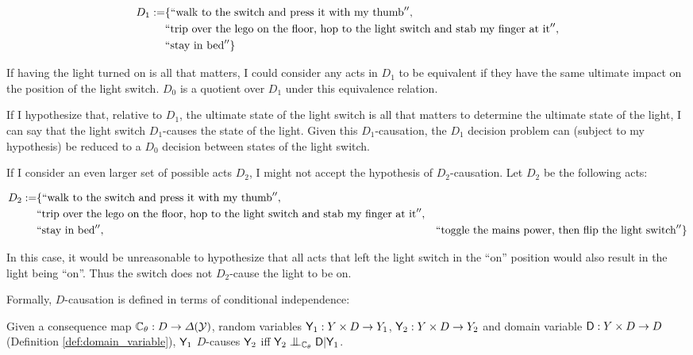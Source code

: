 \begin{align*}
D_1:=&\{``\text{walk to the switch and press it with my thumb}'', \\
    &``\text{trip over the lego on the floor, hop to the light switch and stab my finger at it}'',\\
    &``\text{stay in bed}''\}
\end{align*}

If having the light turned on is all that matters, I could consider any acts in $D_1$ to be equivalent if they have the same ultimate impact on the position of the light switch. $D_0$ is a quotient over $D_1$ under this equivalence relation. 

If I hypothesize that, relative to $D_1$, the ultimate state of the light switch is all that matters to determine the ultimate state of the light, I can say that the light switch $D_1$-causes the state of the light. Given this $D_1$-causation, the $D_1$ decision problem can (subject to my hypothesis) be reduced to a $D_0$ decision between states of the light switch.

If I consider an even larger set of possible acts $D_2$, I might not accept the hypothesis of $D_2$-causation. Let $D_2$ be the following acts:

\begin{align*}
D_2:=&\{``\text{walk to the switch and press it with my thumb}'', \\
    &``\text{trip over the lego on the floor, hop to the light switch and stab my finger at it}'',\\
    &``\text{stay in bed}'',
    &``\text{toggle the mains power, then flip the light switch}''\}
\end{align*}

In this case, it would be unreasonable to hypothesize that all acts that left the light switch in the ``on'' position would also result in the light being ``on''. Thus the switch does not $D_2$-cause the light to be on.

Formally, $D$-causation is defined in terms of conditional independence:

\begin{definition}[$D$-causation]\label{def:d_cause}
Given a consequence map $\mathbb{C}_\theta:D\to \Delta(\mathcal{Y})$, random variables $\mathsf{Y}_1:Y\times D\to Y_1$, $\mathsf{Y}_2:Y\times D\to Y_2$ and domain variable $\mathsf{D}:Y\times D\to D$ (Definition \ref{def:domain_variable}), $\mathsf{Y}_1$ $D$-causes $\mathsf{Y}_2$ iff $\RV{Y}_2\CI_{\kernel{C}_\theta} \RV{D}|\RV{Y}_1$.
\end{definition}

